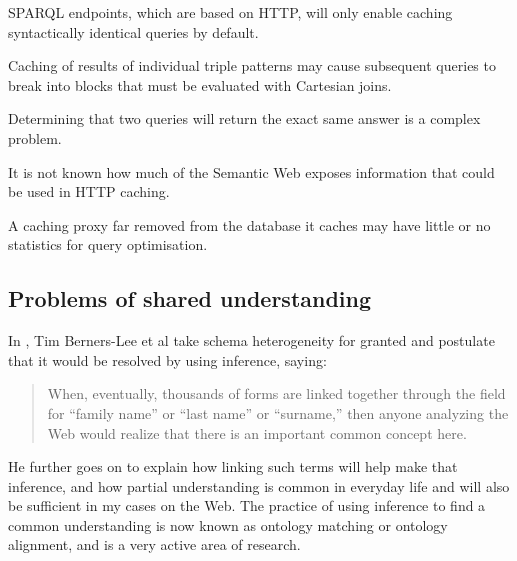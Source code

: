 \begin{problem}\label{prob:syntacticcache}
SPARQL endpoints, which are based on HTTP, will only enable caching
syntactically identical queries by  default.
\end{problem}

\begin{problem}\label{prob:cachecartesian}
Caching of results of individual triple patterns may cause subsequent
queries to break into blocks that must be evaluated with Cartesian joins.
\end{problem}

\begin{problem}\label{prob:queryeq}
Determining that two queries will return the exact same answer is a
complex problem.
\end{problem}

\begin{problem}\label{prob:sanity}
It is not known how much of the Semantic Web exposes information that
could be used in HTTP caching.
\end{problem}

\begin{problem}\label{prob:nostats}
A caching proxy far removed from the database it caches may have
little or no statistics for query optimisation.
\end{problem}



\subsection{Problems of shared understanding}\label{sec:semproblems}

In \cite{berners2000weaving}, Tim Berners-Lee et al take schema
heterogeneity for granted and postulate that it would be resolved by using
inference, saying:

\begin{quote}
When, eventually, thousands of forms are linked together through the
field for ``family name'' or ``last name'' or ``surname,'' then anyone
analyzing the Web would realize that there is an important common
concept here.
\end{quote}

He further goes on to explain how linking such terms will help make
that inference, and how partial understanding is common in everyday
life and will also be sufficient in my cases on the Web. The practice
of using inference to find a common understanding is now known as
ontology matching or ontology alignment, and is a very active area of
research.


